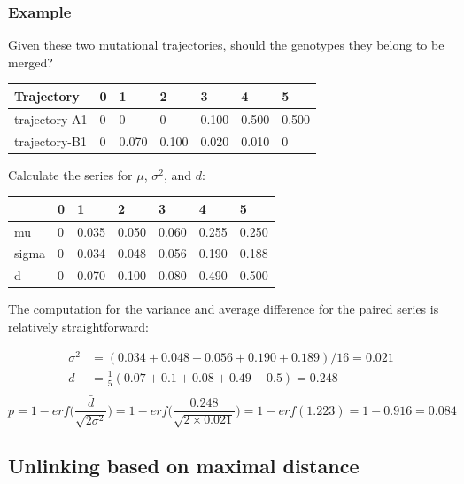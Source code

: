 \documentclass{report}
\begin{document}
\subsubsection{Example}

Given these two mutational trajectories, should the genotypes they belong to be merged?

\begin{table}[H]
  \begin{center}
    \begin{tabular}{l|llllll}
      Trajectory & 0 & 1 & 2 & 3 & 4 & 5 \\
    \hline
     trajectory-A1 & 0 & 0     & 0     & 0.100 & 0.500 & 0.500 \\
     trajectory-B1 & 0 & 0.070 & 0.100 & 0.020 & 0.010 & 0   \\
    \end{tabular}
  \end{center}
\end{table}

Calculate the series for $\mu$, $\sigma^2$, and $d$:

\begin{table}[H]
  \begin{center}
    \begin{tabular}{l|llllll}
      & 0 & 1 & 2 & 3 & 4 & 5 \\
    \hline
     mu         & 0 & 0.035  & 0.050 & 0.060 & 0.255 & 0.250 \\
     sigma      & 0 & 0.034  & 0.048 & 0.056 & 0.190 & 0.188 \\
     d          & 0 & 0.070  & 0.100 & 0.080 & 0.490 & 0.500 \\
    \end{tabular}
  \end{center}
\end{table}

The computation for the variance and average difference for the paired series is relatively straightforward:

\begin{align*}
\sigma^2 &= (0.034+0.048+0.056+0.190+0.189)/16=0.021 \\
\bar{d}  &= \frac{1}{5}(0.07+0.1+0.08+0.49+0.5)=0.248 \\
\end{align*}
\[
p = 1 - erf \bigg(\frac{\bar{d}}{\sqrt{2\sigma^2}}\bigg)=
1-erf \bigg(\frac{0.248}{\sqrt{2 \times 0.021}}\bigg)=
1-erf(1.223)=1-0.916=0.084
\]


\subsection{Unlinking based on maximal distance}
\end{document}
